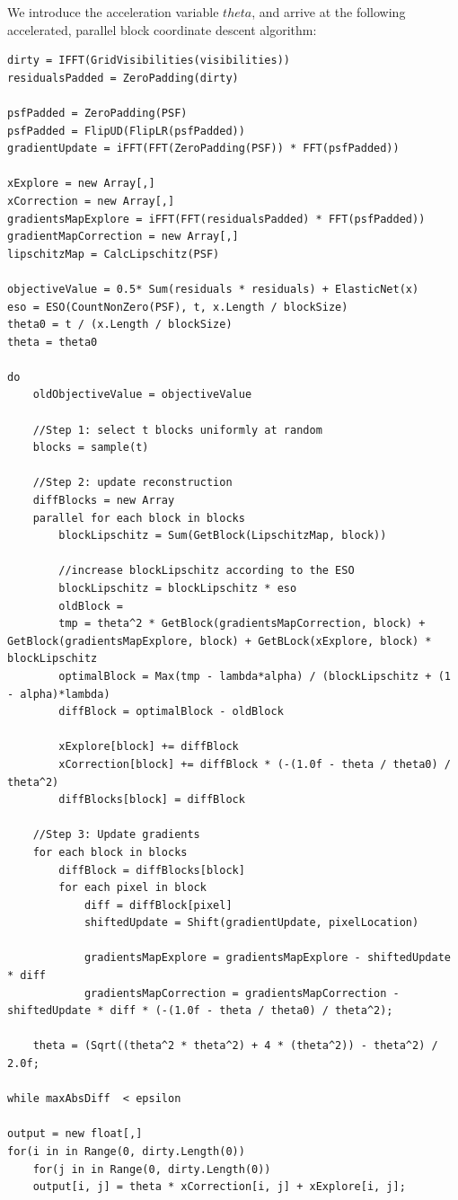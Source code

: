 We introduce the acceleration variable $theta$, and arrive at the following accelerated, parallel block coordinate descent algorithm:
\begin{lstlisting}
dirty = IFFT(GridVisibilities(visibilities))
residualsPadded = ZeroPadding(dirty)

psfPadded = ZeroPadding(PSF)
psfPadded = FlipUD(FlipLR(psfPadded))
gradientUpdate = iFFT(FFT(ZeroPadding(PSF)) * FFT(psfPadded))

xExplore = new Array[,]
xCorrection = new Array[,]
gradientsMapExplore = iFFT(FFT(residualsPadded) * FFT(psfPadded))
gradientMapCorrection = new Array[,]
lipschitzMap = CalcLipschitz(PSF)

objectiveValue = 0.5* Sum(residuals * residuals) + ElasticNet(x)
eso = ESO(CountNonZero(PSF), t, x.Length / blockSize)
theta0 = t / (x.Length / blockSize)
theta = theta0

do 
	oldObjectiveValue = objectiveValue
	
	//Step 1: select t blocks uniformly at random
	blocks = sample(t)
	
	//Step 2: update reconstruction
	diffBlocks = new Array
	parallel for each block in blocks
		blockLipschitz = Sum(GetBlock(LipschitzMap, block))
		
		//increase blockLipschitz according to the ESO
		blockLipschitz = blockLipschitz * eso
		oldBlock = 
		tmp = theta^2 * GetBlock(gradientsMapCorrection, block) + GetBlock(gradientsMapExplore, block) + GetBLock(xExplore, block) * blockLipschitz
		optimalBlock = Max(tmp - lambda*alpha) / (blockLipschitz + (1 - alpha)*lambda)
		diffBlock = optimalBlock - oldBlock
		
		xExplore[block] += diffBlock
		xCorrection[block] += diffBlock * (-(1.0f - theta / theta0) / theta^2)
		diffBlocks[block] = diffBlock
	
	//Step 3: Update gradients
	for each block in blocks
		diffBlock = diffBlocks[block]
		for each pixel in block
			diff = diffBlock[pixel]
			shiftedUpdate = Shift(gradientUpdate, pixelLocation)
			
			gradientsMapExplore = gradientsMapExplore - shiftedUpdate * diff
			gradientsMapCorrection = gradientsMapCorrection - shiftedUpdate * diff * (-(1.0f - theta / theta0) / theta^2);
			
	theta = (Sqrt((theta^2 * theta^2) + 4 * (theta^2)) - theta^2) / 2.0f;

while maxAbsDiff  < epsilon

output = new float[,]
for(i in in Range(0, dirty.Length(0))
	for(j in in Range(0, dirty.Length(0))
	output[i, j] = theta * xCorrection[i, j] + xExplore[i, j];
\end{lstlisting}

